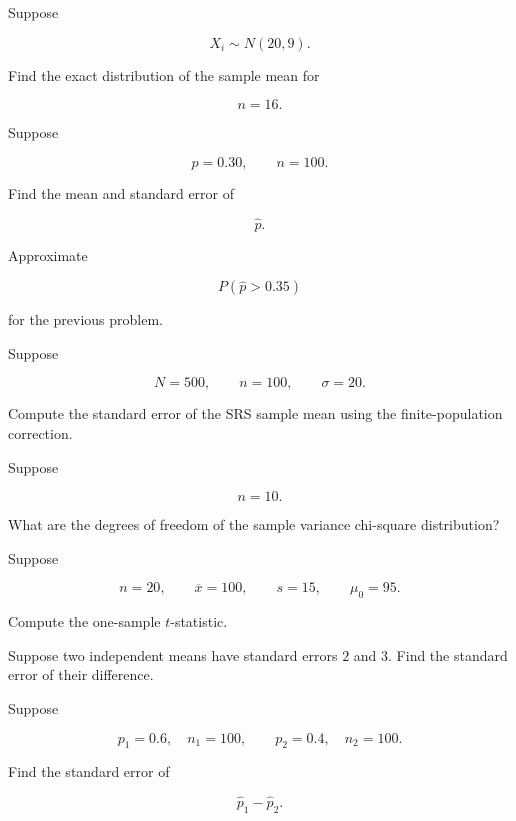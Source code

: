 \begin{exercise}[2]
Suppose

\[
X_i\sim N(20,9).
\]

Find the exact distribution of the sample mean for

\[
n=16.
\]
\end{exercise}

\begin{exercise}[2]
Suppose

\[
p=0.30,
\qquad
n=100.
\]

Find the mean and standard error of

\[
\widehat{p}.
\]
\end{exercise}

\begin{exercise}[2]
Approximate

\[
P(\widehat{p}>0.35)
\]

for the previous problem.
\end{exercise}

\begin{exercise}[2]
Suppose

\[
N=500,
\qquad
n=100,
\qquad
\sigma=20.
\]

Compute the standard error of the SRS sample mean using the
finite-population correction.
\end{exercise}

\begin{exercise}[2]
Suppose

\[
n=10.
\]

What are the degrees of freedom of the sample variance chi-square
distribution?
\end{exercise}

\begin{exercise}[2]
Suppose

\[
n=20,
\qquad
\overline{x}=100,
\qquad
s=15,
\qquad
\mu_0=95.
\]

Compute the one-sample \(t\)-statistic.
\end{exercise}

\begin{exercise}[2]
Suppose two independent means have standard errors \(2\) and \(3\).
Find the standard error of their difference.
\end{exercise}

\begin{exercise}[2]
Suppose

\[
p_1=0.6,\quad n_1=100,
\qquad
p_2=0.4,\quad n_2=100.
\]

Find the standard error of

\[
\widehat{p}_1-\widehat{p}_2.
\]
\end{exercise}

